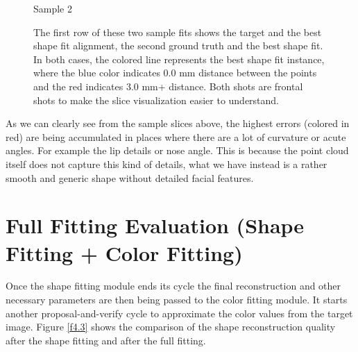 \begin{figure}
  Sample 2


  \caption{The first row of these two sample fits shows the target and the best shape fit alignment, the second ground truth and the best shape fit. In both cases, the colored line represents the best shape fit instance, where the blue color indicates 0.0 mm distance between the points and the red indicates 3.0 mm+ distance. Both shots are frontal shots to make the slice visualization easier to understand.}
  \label{f4.2}
\end{figure}

As we can clearly see from the sample slices above, the highest errors (colored in red) are being accumulated in places where there are a lot of curvature or acute angles. For example the lip details or nose angle. This is because the point cloud itself does not capture this kind of details, what we have instead is a rather smooth and generic shape without detailed facial features.  

\section{Full Fitting Evaluation (Shape Fitting + Color Fitting)}
Once the shape fitting module ends its cycle the final reconstruction and other necessary parameters are then being passed to the color fitting module. It starts another proposal-and-verify cycle to approximate the color values from the target image. Figure \ref{f4.3} shows the comparison of the shape reconstruction quality after the shape fitting and after the full fitting.

